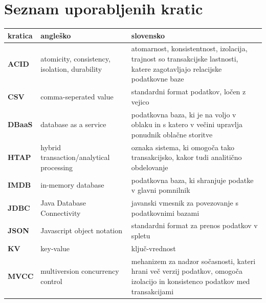 \documentclass[a4paper, 12pt]{book}
\newcommand{\clearemptydoublepage}{\newpage{\pagestyle{empty}\cleardoublepage}}
\begin{document}
\vspace{2cm}


\clearemptydoublepage


\pagestyle{empty}
\def\thepage{}%
\tableofcontents{}


\clearemptydoublepage


\chapter*{Seznam uporabljenih kratic}  %

\noindent\begin{longtable}{p{}|p{}|p{}}
    {\bf kratica} & {\bf angleško}
        & {\bf slovensko}
        \\ \hline
    {\bf ACID}  & atomicity, consistency, isolation, durability
        & atomarnost, konsistentnost, izolacija, trajnost so transakcijske lastnosti, katere zagotavljajo relacijske podatkovne baze
        \\
    {\bf CSV}   & comma-seperated value
        & standardni format podatkov, ločen z vejico
        \\
    {\bf DBaaS}   & database as a service
        & podatkovna baza, ki je na voljo v oblaku in s katero v večini upravlja ponudnik oblačne storitve 
        \\
    {\bf HTAP}  & hybrid transaction/analytical processing
        & oznaka sistema, ki omogoča tako transakcijsko, kakor tudi analitično obdelovanje
        \\
    {\bf IMDB}  & in-memory database
        & podatkovna baza, ki shranjuje podatke v glavni pomnilnik
        \\
    {\bf JDBC}  & Java Database Connectivity
        & javanski vmesnik za povezovanje s podatkovnimi bazami
        \\
    {\bf JSON}  & Javascript object notation
        &  standardni format za prenos podatkov v spletu\\
    {\bf KV}    & key-value
        & ključ-vrednost \\
    {\bf MVCC}    & multiversion concurrency control
        & mehanizem za nadzor sočasnosti, kateri hrani več verzij podatkov, omogoča izolacijo in konsistenco podatkov med transakcijami \\

\end{longtable}
\end{document}
